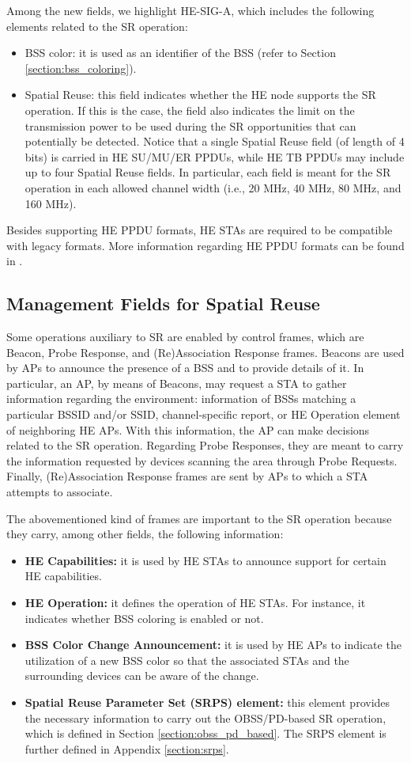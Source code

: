 \documentclass{ieeeaccess}
\begin{document}
Among the new fields, we highlight HE-SIG-A, which includes the following elements related to the SR operation:
\begin{itemize}
	\item BSS color: it is used as an identifier of the BSS (refer to Section \ref{section:bss_coloring}).
	\item Spatial Reuse: this field indicates whether the HE node supports the SR operation. If this is the case, the field also indicates the limit on the transmission power to be used during the SR opportunities that can potentially be detected. Notice that a single Spatial Reuse field (of length of 4 bits) is carried in HE SU/MU/ER PPDUs,  while HE TB PPDUs may include up to four Spatial Reuse fields. In particular, each field is meant for the SR operation in each allowed channel width (i.e., 20 MHz, 40 MHz, 80 MHz, and 160 MHz).
\end{itemize}

Besides supporting HE PPDU formats, HE STAs are required to be compatible with legacy formats. More information regarding HE PPDU formats can be found in \cite{rhode2017whitepaper}. 

\subsection{Management Fields for Spatial Reuse}
Some operations auxiliary to SR are enabled by control frames, which are Beacon, Probe Response, and (Re)Association Response frames. Beacons are used by APs to announce the presence of a BSS and to provide details of it. In particular, an AP, by means of Beacons, may request a STA to gather information regarding the environment: information of BSSs matching a particular BSSID and/or SSID, channel-specific report, or HE Operation element of neighboring HE APs. With this information, the AP can make decisions related to the SR operation. Regarding Probe Responses, they are meant to carry the information requested by devices scanning the area through Probe Requests. Finally, (Re)Association Response frames are sent by APs to which a STA attempts to associate.

The abovementioned kind of frames are important to the SR operation because they carry, among other fields, the following information:
\begin{itemize}
	\item \textbf{HE Capabilities:} it is used by HE STAs to announce support for certain HE capabilities.
	\item \textbf{HE Operation:} it defines the operation of HE STAs. For instance, it indicates whether BSS coloring is enabled or not.
	\item \textbf{BSS Color Change Announcement:} it is used by HE APs to indicate the utilization of a new BSS color so that the associated STAs and the surrounding devices can be aware of the change.
	\item \textbf{Spatial Reuse Parameter Set (SRPS) element:} this element provides the necessary information to carry out the OBSS/PD-based SR operation, which is defined in Section \ref{section:obss_pd_based}. The SRPS element is further defined in Appendix \ref{section:srps}.
\end{itemize}
\end{document}
